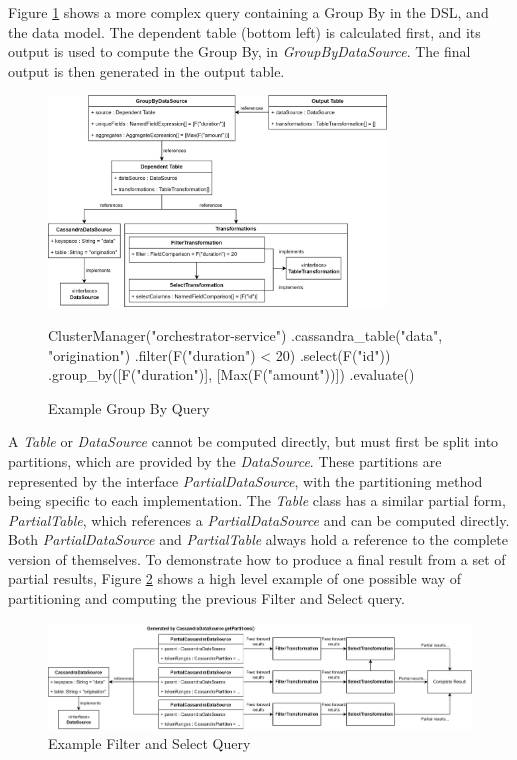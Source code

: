 Figure \ref{fig:group-by-query} shows a more complex query containing a Group By in the DSL, and the data model. The dependent table (bottom left) is calculated first, and its output is used to compute the Group By, in \textit{GroupByDataSource}. The final output is then generated in the output table.

\begin{figure}[htp]
	\centering
	\includegraphics[width=0.8\textwidth]{chapters/diagrams/implementation/group-by-query}
	\linebreak
	\begin{python}
ClusterManager("orchestrator-service")
.cassandra_table("data", "origination")
.filter(F("duration") < 20)
.select(F("id"))
.group_by([F("duration")], [Max(F("amount"))])
.evaluate()
	\end{python}
	\caption{Example Group By Query}
	\label{fig:group-by-query}
\end{figure}

A \textit{Table} or \textit{DataSource} cannot be computed directly, but must first be split into partitions, which are provided by the \textit{DataSource}. These partitions are represented by the interface \textit{PartialDataSource}, with the partitioning method being specific to each implementation. The \textit{Table} class has a similar partial form, \textit{PartialTable}, which references a \textit{PartialDataSource} and can be computed directly. Both \textit{PartialDataSource} and \textit{PartialTable} always hold a reference to the complete version of themselves. To demonstrate how to produce a final result from a set of partial results, Figure \ref{fig:partial-filter-select-query} shows a high level example of one possible way of partitioning and computing the previous Filter and Select query.

\begin{figure}[h]
	\centering
	\includegraphics[width=\textwidth]{chapters/diagrams/implementation/partial-filter-select-query}
	\caption{Example Filter and Select Query}
	\label{fig:partial-filter-select-query}
\end{figure}



